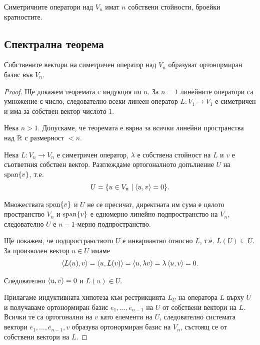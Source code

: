 \documentclass[numbers=endperiod, bibliography=totocnumbered]{scrartcl}
\begin{document}
\begin{corollary}
  Симетричните оператори над \( V_n \) имат \( n \) собствени стойности, броейки кратностите.
\end{corollary}

\subsection{Спектрална теорема}

\begin{theorem}
  Собствените вектори на симетричен оператор над \( V_n \) образуват ортонормиран базис във \( V_n \).
\end{theorem}
\begin{proof}
  Ще докажем теоремата с индукция по \( n \). За \( n = 1 \) линейните оператори са умножение с число, следователно всеки линеен оператор \( L: V_1 \to V_1 \) е симетричен и има за собствен вектор числото \( 1 \).

  Нека \( n > 1 \). Допускаме, че теоремата е вярна за всички линейни пространства над \( \mathbb{R} \) с размерност \( < n \).

  Нека \( L: V_n \to V_n \) е симетричен оператор, \( \lambda \) е собствена стойност на \( L \) и \( v \) е съответния собствен вектор. Разглеждаме ортогоналното допълнение \( U \) на \( \operatorname{span} \{ v \} \), т.е.
  \begin{align*}
    U = \{ u \in V_n \mid \left\langle u, v \right\rangle = 0 \}.
  \end{align*}

  Множествата \( \operatorname{span} \{ v \} \) и \( U \) не се пресичат, директната им сума е цялото пространство \( V_n \) и \( \operatorname{span} \{ v \} \) е едномерно линейно подпространство на \( V_n \), следователно \( U \) е \( n-1 \)-мерно подпространство.

  Ще покажем, че подпространството \( U \) е инвариантно относно \( L \), т.е. \( L(U) \subseteq U \). За произволен вектор \( u \in U \) имаме
  \begin{align*}
    \left\langle L(u), v \right\rangle
    =
    \left\langle u, L(v) \right\rangle
    =
    \left\langle u, \lambda v \right\rangle
    =
    \lambda \left\langle u, v \right\rangle
    =
    0.
  \end{align*}

  Следователно \( \left\langle u, v \right\rangle = 0 \) и \( L(u) \in U \).

  Прилагаме индуктивната хипотеза към рестрикцията \( L_U \) на оператора \( L \) върху \( U \) и получаваме ортонормиран базис \( e_1, \ldots, e_{n-1} \) на \( U \) от собствени вектори на \( L \). Всички те са ортогонални на \( v \) като елементи на \( U \), следователно системата вектори \( e_1, \ldots, e_{n-1}, v \) образува ортонормиран базис на \( V_n \), състоящ се от собствени вектори на \( L \).
\end{proof}
\end{document}
